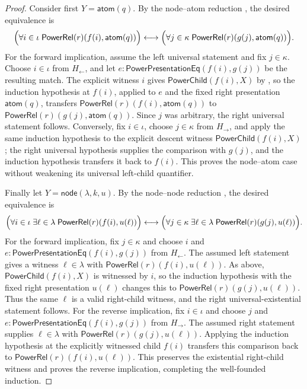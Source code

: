 \begin{proof}
Consider first $Y=\mathsf{atom}(q)$.  By the node--atom reduction
, the desired equivalence is
\[
 \Bigl(\forall i\in\iota\;\mathsf{PowerRel}(r)(f(i),\mathsf{atom}(q))\Bigr)
 \longleftrightarrow
 \Bigl(\forall j\in\kappa\;\mathsf{PowerRel}(r)(g(j),\mathsf{atom}(q))\Bigr).
\]
For the forward implication, assume the left universal statement and fix
$j\in\kappa$.  Choose $i\in\iota$ from $H_{\leftarrow}$, and let
$e:\mathsf{PowerPresentationEq}(f(i),g(j))$ be the resulting match.  The
explicit witness $i$ gives \(\mathsf{PowerChild}(f(i),X)\) by
, so the induction hypothesis at $f(i)$, applied to $e$
and the fixed right presentation $\mathsf{atom}(q)$, transfers
\(\mathsf{PowerRel}(r)(f(i),\mathsf{atom}(q))\) to
\(\mathsf{PowerRel}(r)(g(j),\mathsf{atom}(q))\).  Since $j$ was arbitrary,
the right universal statement follows.  Conversely, fix $i\in\iota$, choose
$j\in\kappa$ from $H_{\to}$, and apply the same induction hypothesis to the
explicit descent witness \(\mathsf{PowerChild}(f(i),X)\); the right
universal hypothesis supplies the comparison with $g(j)$, and the induction
hypothesis transfers it back to $f(i)$.  This proves the node--atom case
without weakening its universal left-child quantifier.

Finally let $Y=\mathsf{node}(\lambda,k,u)$.  By the node--node reduction
, the desired equivalence is
\[
 \Bigl(\forall i\in\iota\;\exists \ell\in\lambda\;
      \mathsf{PowerRel}(r)(f(i),u(\ell))\Bigr)
 \longleftrightarrow
 \Bigl(\forall j\in\kappa\;\exists \ell\in\lambda\;
      \mathsf{PowerRel}(r)(g(j),u(\ell))\Bigr).
\]
For the forward implication, fix $j\in\kappa$ and choose $i$ and
$e:\mathsf{PowerPresentationEq}(f(i),g(j))$ from $H_{\leftarrow}$.  The
assumed left statement gives a witness $\ell\in\lambda$ with
$\mathsf{PowerRel}(r)(f(i),u(\ell))$.  As above,
$\mathsf{PowerChild}(f(i),X)$ is witnessed by $i$, so the induction
hypothesis with the fixed right presentation $u(\ell)$ changes this to
$\mathsf{PowerRel}(r)(g(j),u(\ell))$.  Thus the same $\ell$ is a valid
right-child witness, and the right universal-existential statement follows.
For the reverse implication, fix $i\in\iota$ and choose $j$ and
$e:\mathsf{PowerPresentationEq}(f(i),g(j))$ from $H_{\to}$.  The assumed
right statement supplies $\ell\in\lambda$ with
$\mathsf{PowerRel}(r)(g(j),u(\ell))$.  Applying the induction hypothesis at
the explicitly witnessed child $f(i)$ transfers this comparison back to
$\mathsf{PowerRel}(r)(f(i),u(\ell))$.  This preserves the existential
right-child witness and proves the reverse implication, completing the
well-founded induction.
\end{proof}
